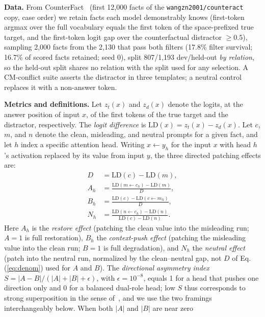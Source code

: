 \documentclass[paper]{ieice}
\begin{document}
\textbf{Data.} From CounterFact~\cite{meng2022rome} (first 12{,}000
facts of the \texttt{wangzn2001/counteract} copy, case order) we
retain facts each
model demonstrably knows (first-token argmax over the full vocabulary
equals the first token of the space-prefixed true target, and the
first-token logit gap over the counterfactual distractor $\ge 0.5$),
sampling 2{,}000 facts from the 2{,}130 that pass both filters
(17.8\% filter survival; 16.7\% of scored facts retained; seed 0),
split 807/1{,}193
dev/held-out \emph{by relation}, so the held-out split shares no relation
with the split used for any selection. A CM-conflict suite asserts the
distractor in three templates; a neutral control replaces it with a
non-answer token.

\textbf{Metrics and definitions.} Let $z_t(x)$ and $z_d(x)$ denote the
logits, at the answer position of input $x$, of the first tokens of the
true target and the distractor, respectively. The \emph{logit difference}
is $\mathrm{LD}(x) = z_t(x) - z_d(x)$. Let $c$, $m$, and $n$ denote the
clean, misleading, and neutral prompts for a given fact, and let
$h$ index a specific attention head. Writing
$x \leftarrow y_h$ for the input $x$ with head $h$'s activation replaced
by its value from input $y$, the three directed patching effects are:
\begin{align}
D &= \mathrm{LD}(c) - \mathrm{LD}(m), \label{eq:denom} \\
A_h &= \frac{\mathrm{LD}(m \leftarrow c_h) - \mathrm{LD}(m)}{D},
\label{eq:A} \\
B_h &= \frac{\mathrm{LD}(c) - \mathrm{LD}(c \leftarrow m_h)}{D},
\label{eq:B} \\
N_h &= \frac{\mathrm{LD}(n \leftarrow c_h) - \mathrm{LD}(n)}
{\mathrm{LD}(c) - \mathrm{LD}(n)}.
\label{eq:N}
\end{align}
Here $A_h$ is the \emph{restore effect} (patching the clean value
into the misleading run; $A{=}1$ is full restoration), $B_h$ the
\emph{context-push effect} (patching the misleading value into the
clean run; $B{=}1$ is full degradation), and $N_h$ the \emph{neutral
effect} (patch into the neutral run, normalized by the clean--neutral
gap, not $D$ of Eq.\,(\ref{eq:denom}) used for $A$ and $B$).
The \emph{directional asymmetry index} $S = |A-B|/(|A|+|B|+\epsilon)$,
with $\epsilon = 10^{-8}$, equals 1 for a head that pushes one direction
only and 0 for a balanced dual-role head; low $S$ thus corresponds to
strong superposition in the sense of~\cite{li2025juice}, and we use the
two framings interchangeably below. When both $|A|$ and $|B|$ are near zero
\end{document}
